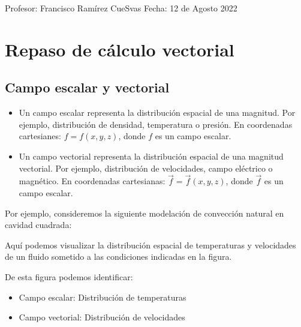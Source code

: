 \documentclass[letterpaper,10pt,english]{jupyterBook}
\let\sphinxpxdimen\pdfpxdimen\else\newdimen\sphinxpxdimen
\begin{document}
Profesor: Francisco Ramírez CueSvas
Fecha: 12 de Agosto 2022


\section{Repaso de cálculo vectorial}
\label{\detokenize{1_ondas_electromagneticas/1_ondas_electromagneticas:repaso-de-calculo-vectorial}}

\subsection{Campo escalar y vectorial}
\label{\detokenize{1_ondas_electromagneticas/1_ondas_electromagneticas:campo-escalar-y-vectorial}}\begin{itemize}
\item {} 
\sphinxAtStartPar
Un campo escalar representa la distribución espacial de una magnitud. Por ejemplo, distribución de densidad, temperatura o presión. En coordenadas cartesianes: \(f = f(x,y,z)\), donde \(f\) es un campo escalar.

\item {} 
\sphinxAtStartPar
Un campo vectorial representa la distribución espacial de una magnitud vectorial. Por ejemplo, distribución de velocidades, campo eléctrico o magnético. En coordenadas cartesianas: \(\vec{f} = \vec{f}(x,y,z)\), donde \(\vec{f}\) es un campo escalar.

\end{itemize}

\sphinxAtStartPar
Por ejemplo, consideremos la siguiente modelación de convección natural en cavidad cuadrada:

\noindent{\hspace*{\fill}\sphinxincludegraphics[width=500\sphinxpxdimen]{{natural_convection}.png}\hspace*{\fill}}

\sphinxAtStartPar
Aquí podemos visualizar la distribución espacial de temperaturas y velocidades de un fluido sometido a las condiciones indicadas en la figura.

\sphinxAtStartPar
De esta figura podemos identificar:
\begin{itemize}
\item {} 
\sphinxAtStartPar
Campo escalar: Distribución de temperaturas

\item {} 
\sphinxAtStartPar
Campo vectorial: Distribución de velocidades

\end{itemize}
\end{document}
